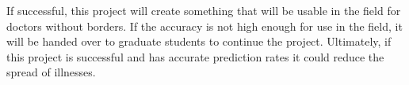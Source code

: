 \documentclass[onecolumn, draftclsnofoot,10pt, compsoc]{IEEEtran}
\begin{document}
		If successful, this project will create something that will be usable in the field for doctors without borders. If the accuracy is not high enough for use in the field, it will be handed over to graduate students to continue the project. Ultimately, if this project is successful and has accurate prediction rates it could reduce the spread of illnesses.
		
		


\end{document}

